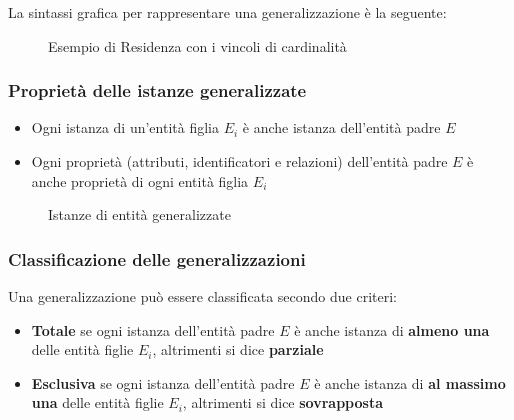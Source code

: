 \documentclass[a4paper,twoside]{article}
\begin{document}
\vspace{1em}
\noindent
La sintassi grafica per rappresentare una generalizzazione è la seguente:
\begin{figure}[H]
  \centering
  \caption{Esempio di Residenza con i vincoli di cardinalità}
\end{figure}

\subsubsection{Proprietà delle istanze generalizzate}
\begin{itemize}
  \item Ogni istanza di un'entità figlia \( E_i \) è anche istanza dell'entità padre \( E \)
  \item Ogni proprietà (attributi, identificatori e relazioni) dell'entità padre \( E \)
    è anche proprietà di ogni entità figlia \( E_i \) 
\end{itemize}
\begin{figure}[H]
  \centering
  \caption{Istanze di entità generalizzate}
\end{figure}

\subsubsection{Classificazione delle generalizzazioni}
Una generalizzazione può essere classificata secondo due criteri:
\begin{itemize}
  \item \textbf{Totale} se ogni istanza dell'entità padre \( E \) è anche istanza
    di \textbf{almeno una} delle entità figlie \( E_i \), altrimenti si dice
    \textbf{parziale}

  \item \textbf{Esclusiva} se ogni istanza dell'entità padre \( E \) è anche istanza
    di \textbf{al massimo una} delle entità figlie \( E_i \), altrimenti si dice
    \textbf{sovrapposta}
\end{itemize}
\end{document}
